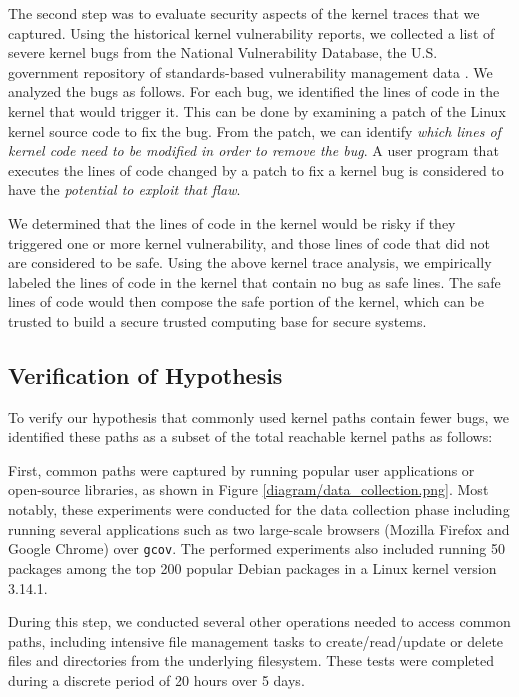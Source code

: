 The second step was to evaluate security aspects of the kernel traces that
we captured. 
Using the historical kernel vulnerability reports, we collected a list of
severe kernel bugs from 
the National Vulnerability Database, the U.S. government repository of
standards-based 
vulnerability management data \cite{NVD}. We analyzed the bugs as
follows. For each bug, we identified the lines of code 
in the kernel that would trigger it. This can be done by examining 
a patch of the Linux kernel source code to fix the bug. From the patch, 
we can identify \textit{which lines of kernel code need to be modified in order to
remove the bug}. 
A user program that executes the lines of code changed by a patch to fix a
kernel bug is considered to have the \textit{potential to exploit that flaw}.

We determined that the lines of code in the kernel would be risky 
if they triggered one or more kernel vulnerability, and those lines of code 
that did not are considered to be safe. Using the above kernel trace
analysis, 
we empirically labeled the lines of code in the kernel that contain no
bug as safe lines.
The safe lines of code would then compose the safe portion of the kernel, 
which can be trusted to build a secure trusted computing base for secure
systems.

\subsection{Verification of Hypothesis}
\label{Verification-of-Hypothesis}

To verify our hypothesis that commonly used kernel paths contain fewer bugs, 
we identified these paths as a subset of the total reachable kernel paths as follows:

First, common paths were captured by running popular user applications or open-source libraries, as shown in Figure \ref{diagram/data_collection.png}. Most notably, these experiments were conducted for the data collection phase including running several applications such as two large-scale browsers (Mozilla Firefox and Google Chrome) over \texttt{gcov}. The  performed experiments also included running 50 packages among the top 200 popular Debian packages \cite{Top-Packages} in a Linux kernel version 3.14.1.

During this step, we conducted several other operations needed to access common paths, including intensive file management tasks to create/read/update or delete files and directories from the underlying filesystem. These tests were completed during a discrete period of 20 hours over 5 days.


